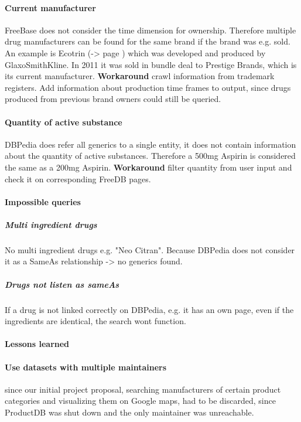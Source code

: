 \documentclass[11pt,titlepage,oneside,openany]{book}
\begin{document}
\paragraph{Current manufacturer}
FreeBase does not consider the time dimension for ownership. Therefore multiple drug manufacturers can be found for the same brand if the brand was e.g. sold. An example is Ecotrin (-> page \pageref{ex:ecotrin}) which was developed and produced by GlaxoSmithKline. In 2011 it was sold in bundle deal to Prestige Brands, which is its current manufacturer.
\textbf{Workaround} crawl information from trademark registers. Add information about production time frames to output, since drugs produced from previous brand owners could still be queried.

\paragraph{Quantity of active substance}
DBPedia does refer all generics to a single entity, it does not contain information about the quantity of active substances. Therefore a 500mg Aspirin is considered the same as a 200mg Aspirin.
\textbf{Workaround} filter quantity from user input and check it on corresponding FreeDB pages.



\paragraph{Impossible queries}
\label{sec:unquery}
\subparagraph{Multi ingredient drugs}No multi ingredient drugs e.g. "Neo Citran". Because DBPedia does not consider it as a SameAs relationship -> no generics found.

\subparagraph{Drugs not listen as sameAs}
If a drug is not linked correctly on DBPedia, e.g. it has an own page, even if the ingredients are identical, the search wont function.


\paragraph{Lessons learned}
\label{cha:lessons}


\paragraph{Use datasets with multiple maintainers} since our initial project proposal, searching manufacturers of certain product categories and visualizing them on Google maps, had to be discarded, since ProductDB was shut down and the only maintainer was unreachable.
\end{document}
